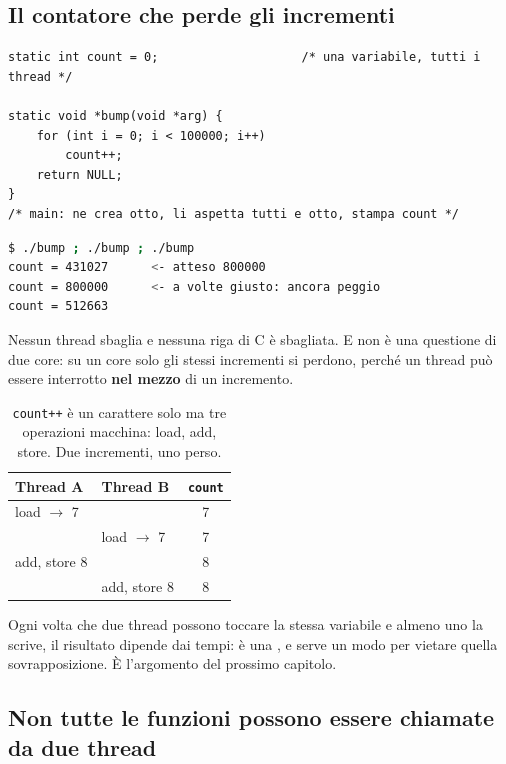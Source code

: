 \subsection{Il contatore che perde gli incrementi}

\begin{lstlisting}[language={[POSIX]C}, style=wnumbers, title={bump.c}]
static int count = 0;                    /* una variabile, tutti i thread */

static void *bump(void *arg) {
    for (int i = 0; i < 100000; i++)
        count++;
    return NULL;
}
/* main: ne crea otto, li aspetta tutti e otto, stampa count */
\end{lstlisting}

\begin{lstlisting}[language=bash]
$ ./bump ; ./bump ; ./bump
count = 431027      <- atteso 800000
count = 800000      <- a volte giusto: ancora peggio
count = 512663
\end{lstlisting}

Nessun thread sbaglia e nessuna riga di C è sbagliata. E non è una questione di due core: su un core solo gli stessi
incrementi si perdono, perché un thread può essere interrotto \textbf{nel mezzo} di un incremento.

\begin{table}[H]
\centering
\begin{tabular}{l l c}
\toprule
\textbf{Thread A} & \textbf{Thread B} & \texttt{count} \\
\midrule
load $\rightarrow$ 7 &                      & 7 \\
                     & load $\rightarrow$ 7 & 7 \\
add, store 8         &                      & 8 \\
                     & add, store 8         & 8 \\
\bottomrule
\end{tabular}
\caption{\texttt{count++} è un carattere solo ma tre operazioni macchina: load, add, store. Due incrementi, uno perso.}
\end{table}

Ogni volta che due thread possono toccare la stessa variabile e almeno uno la scrive, il risultato dipende dai tempi: è
una , e serve un modo per vietare quella sovrapposizione. È l'argomento del prossimo capitolo.

\subsection{Non tutte le funzioni possono essere chiamate da due thread}

